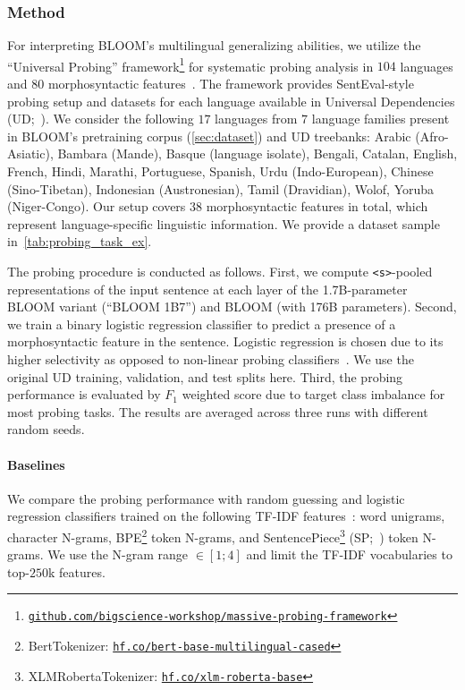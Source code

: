\subsubsection{Method}
\label{subsec:eval:probing}
For interpreting BLOOM's multilingual generalizing abilities, we utilize the ``Universal Probing'' framework\footnote{\href{https://github.com/bigscience-workshop/massive-probing-framework}{\texttt{github.com/bigscience-workshop/massive-probing-framework}}} for systematic probing analysis in $104$ languages and $80$ morphosyntactic features~\citep{serikov2022universal}. The framework provides SentEval-style~\citep{conneau-etal-2018-cram} probing setup and datasets for each language available in Universal Dependencies (UD;~\citealp{nivre-etal-2016-universal}). We consider the following $17$ languages from $7$ language families present in BLOOM's pretraining corpus (\ref{sec:dataset}) and UD treebanks: Arabic (Afro-Asiatic), Bambara (Mande), Basque (language isolate), Bengali, Catalan, English, French, Hindi, Marathi, Portuguese, Spanish, Urdu (Indo-European), Chinese (Sino-Tibetan), Indonesian (Austronesian), Tamil (Dravidian), Wolof, Yoruba (Niger-Congo). Our setup covers $38$ morphosyntactic features in total, which represent language-specific linguistic information. We provide a dataset sample in~\autoref{tab:probing_task_ex}.

The probing procedure is conducted as follows. First, we compute \texttt{<s>}-pooled representations of the input sentence at each layer of the 1.7B-parameter BLOOM variant (``BLOOM 1B7'') and BLOOM (with 176B parameters). Second, we train a binary logistic regression classifier to predict a presence of a morphosyntactic feature in the sentence. Logistic regression is chosen due to its higher selectivity as opposed to non-linear probing classifiers~\citep{hewitt-liang-2019-designing}. We use the original UD training, validation, and test splits here. Third, the probing performance is evaluated by $F_1$ weighted score due to target class imbalance for most probing tasks. The results are averaged across three runs with different random seeds.

\paragraph{Baselines} We compare the probing performance with random guessing and logistic regression classifiers trained on the following TF-IDF features~\citep{salton1973specification}: word unigrams, character N-grams, BPE\footnote{BertTokenizer: \href{https://hf.co/bert-base-multilingual-cased}{\texttt{hf.co/bert-base-multilingual-cased}}} token N-grams, and  SentencePiece\footnote{XLMRobertaTokenizer: \href{https://hf.co/xlm-roberta-base}{\texttt{hf.co/xlm-roberta-base}}} (SP;~\citealp{kudo-richardson-2018-sentencepiece}) token N-grams. We use the N-gram range $\in [1; 4]$ and limit the TF-IDF vocabularies to top-$250$k features. 

